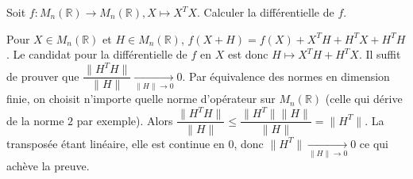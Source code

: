\documentclass{fancybook}
\begin{document}
\begin{exercice}
Soit $f:M_n(\mathbb R) \to M_n(\mathbb R), X\mapsto X^TX$.
Calculer la différentielle de $f$.
\end{exercice}
Pour $X\in M_n(\mathbb R)$ et $H\in M_n(\mathbb R)$, $f(X+H)=f(X)+X^TH+H^TX+H^TH$.\newline
Le candidat pour la différentielle de $f$ en $X$ est donc $H\mapsto X^TH+H^TX$.\newline
Il suffit de prouver que $\dfrac{\|H^TH\|}{\|H\|}\xrightarrow[\|H\|\to 0]{} 0$.\newline
Par équivalence des normes en dimension finie, on choisit n'importe quelle norme d'opérateur sur $M_n(\mathbb R)$ (celle qui dérive de la norme $2$ par exemple). Alors $\dfrac{\|H^TH\|}{\|H\|}\leq \dfrac{\|H^T\| \|H\|}{\|H\|} = \|H^T\|$. La transposée étant linéaire, elle est continue en $0$, donc $\|H^T\|\xrightarrow[\|H\|\to 0]{} 0 $ ce qui achève la preuve.
\end{document}

